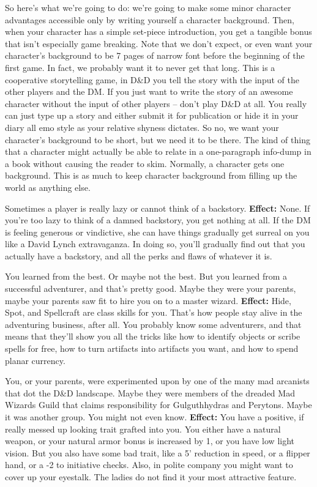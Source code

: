 So here's what we're going to do: we're going to make some minor character advantages accessible only by writing yourself a character background. Then, when your character has a simple set-piece introduction, you get a tangible bonus that isn't especially game breaking. Note that we don't expect, or even want your character's background to be 7 pages of narrow font before the beginning of the first game. In fact, we probably want it to never get that long. This is a cooperative storytelling game, in D\&D you tell the story with the input of the other players and the DM. If you just want to write the story of an awesome character without the input of other players -- don't play D\&D at all. You really can just type up a story and either submit it for publication or hide it in your diary all emo style as your relative shyness dictates. So no, we want your character's background to be short, but we need it to be there. The kind of thing that a character might actually be able to relate in a one-paragraph info-dump in a book without causing the reader to skim. Normally, a character gets one background. This is as much to keep character background from filling up the world as anything else.

\medskip{}
{Sometimes a player is really lazy or cannot think of a backstory.}
\textbf{Effect:}{ None. If you're too lazy to think of a damned backstory, you get nothing at all. If the DM is feeling generous or vindictive, she can have things gradually get surreal on you like a David Lynch extravaganza. In doing so, you'll gradually find out that you actually have a backstory, and all the perks and flaws of whatever it is.}

\medskip{}
{You learned from the best. Or maybe not the best. But you learned from a successful adventurer, and that's pretty good. Maybe they were your parents, maybe your parents saw fit to hire you on to a master wizard.}
\textbf{Effect:}{ Hide, Spot, and Spellcraft are class skills for you. That's how people stay alive in the adventuring business, after all. You probably know some adventurers, and that means that they'll show you all the tricks like how to identify objects or scribe spells for free, how to turn artifacts into artifacts you want, and how to spend planar currency.}

\medskip{}
{You, or your parents, were experimented upon by one of the many mad arcanists that dot the D\&D landscape. Maybe they were members of the dreaded Mad Wizards Guild that claims responsibility for Gulguthhydras and Perytons. Maybe it was another group. You might not even know.}
\textbf{Effect:}{ You have a positive, if really messed up looking trait grafted into you. You either have a natural weapon, or your natural armor bonus is increased by 1, or you have low light vision. But you also have some bad trait, like a 5' reduction in speed, or a flipper hand, or a -2 to initiative checks. Also, in polite company you might want to cover up your eyestalk. The ladies do not find it your most attractive feature.}

